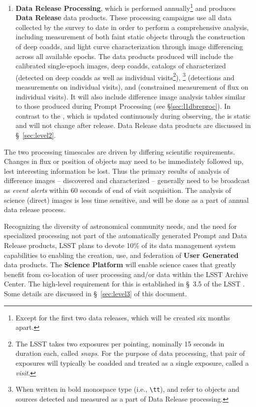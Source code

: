 \begin{enumerate}
\item \textbf{Data Release Processing}, which is performed annually\footnote{Except for the first two data releases, which will be created six months apart.} and produces \textbf{Data Release} data products. These processing campaigns use all data collected by the survey to date in order to perform a comprehensive analysis, including measurement of both faint static objects through the construction of deep coadds, and light curve characterization through image differencing across all available epochs.
    The data products produced will include the calibrated single-epoch images, deep coadds, catalogs of characterized \Objects (detected on deep coadds as well as individual visits\footnote{The LSST takes two exposures per pointing, nominally 15 seconds in duration each, called \emph{snaps}. For the purpose of data processing, that pair of exposures will typically be coadded and treated as a single exposure, called a \emph{visit}.}), \Sources\footnote{When written in bold monospace type (i.e., \texttt{\textbackslash{}tt}), \Objects and \Sources refer to objects and sources detected and measured as a part of Data Release processing.} (detections and measurements on individual visits), and \ForcedSources (constrained measurement of flux on individual visits). It will also include difference image analysis tables similar to those produced during Prompt Processing (see \S \ref{sec:l1dbreproc}). In contrast to the \PPDB, which is updated continuously during observing, the \DR is static and will not change after release. Data Release data products are discussed in \S~\ref{sec:level2}.

\end{enumerate}


The two processing timescales are driven by differing scientific requirements. Changes in flux or position of objects may need to be immediately followed up, lest interesting information be lost. Thus the primary results of analysis of difference images -- discovered and characterized \DIASources{} -- generally need to be broadcast as \emph{event alerts} within 60 seconds of end of visit acquisition. The analysis of science (direct) images is less time sensitive, and will be done as a part of annual data release process.

Recognizing the diversity of astronomical community needs, and the need for specialized processing not part of the automatically generated Prompt and Data Release products, LSST plans to devote 10\% of its data management system capabilities to enabling the creation, use, and federation of \textbf{User Generated} data products. The \textbf{Science Platform}  will enable science cases that greatly benefit from co-location of user processing and/or data within the LSST Archive Center. The high-level requirement for this is established in \S~3.5 of the LSST \SRD. Some  details are discussed in \S~\ref{sec:level3} of this document.


